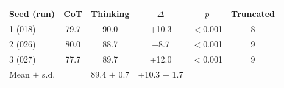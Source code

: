 \begin{tabular}{lccccc}
\toprule
Seed (run) & CoT & Thinking & $\Delta$ & $p$ & Truncated \\
\midrule
1 (018) & 79.7 & 90.0 & +10.3 & $<$0.001 & 8 \\
2 (026) & 80.0 & 88.7 & +8.7 & $<$0.001 & 9 \\
3 (027) & 77.7 & 89.7 & +12.0 & $<$0.001 & 9 \\
\midrule
Mean $\pm$ s.d. & & 89.4 $\pm$ 0.7 & +10.3 $\pm$ 1.7 & & \\
\bottomrule
\end{tabular}
